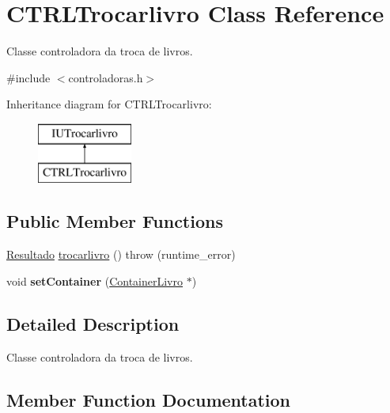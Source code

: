 \hypertarget{classCTRLTrocarlivro}{}\section{C\+T\+R\+L\+Trocarlivro Class Reference}
\label{classCTRLTrocarlivro}


Classe controladora da troca de livros.  




{\ttfamily \#include $<$controladoras.\+h$>$}

Inheritance diagram for C\+T\+R\+L\+Trocarlivro\+:\begin{figure}[H]
\begin{center}
\leavevmode
\includegraphics[height=2.000000cm]{classCTRLTrocarlivro}
\end{center}
\end{figure}
\subsection*{Public Member Functions}
\begin{DoxyCompactItemize}
\item 
\hyperlink{classResultado}{Resultado} \hyperlink{classCTRLTrocarlivro_ab0bd103af757427e4272e44dfbe47a49}{trocarlivro} ()  throw (runtime\+\_\+error)
\item 
\mbox{\label{classCTRLTrocarlivro_a792f23f239b390e1f36bd62604ae0f0c}} 
void {\bfseries set\+Container} (\hyperlink{classContainerLivro}{Container\+Livro} $\ast$)
\end{DoxyCompactItemize}


\subsection{Detailed Description}
Classe controladora da troca de livros. 

\subsection{Member Function Documentation}
\mbox{\label{classCTRLTrocarlivro_ab0bd103af757427e4272e44dfbe47a49}} 
